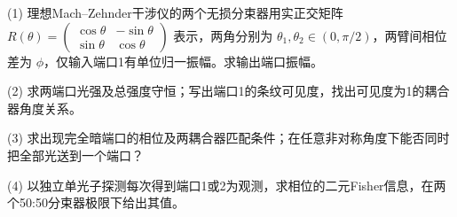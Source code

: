 (1) 理想Mach–Zehnder干涉仪的两个无损分束器用实正交矩阵 \(R(\theta)=\left(\begin{smallmatrix}\cos\theta&-\sin\theta\\\sin\theta&\cos\theta\end{smallmatrix}\right)\) 表示，两角分别为 \(\theta_1,\theta_2\in(0,\pi/2)\)，两臂间相位差为 \(\phi\)，仅输入端口1有单位归一振幅。求输出端口振幅。

(2) 求两端口光强及总强度守恒；写出端口1的条纹可见度，找出可见度为1的耦合器角度关系。

(3) 求出现完全暗端口的相位及两耦合器匹配条件；在任意非对称角度下能否同时把全部光送到一个端口？

(4) 以独立单光子探测每次得到端口1或2为观测，求相位的二元Fisher信息，在两个50:50分束器极限下给出其值。
